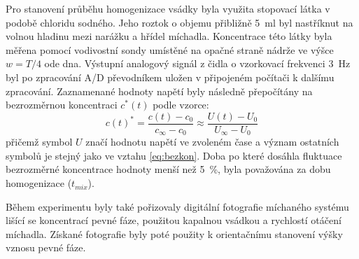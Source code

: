 Pro stanovení průběhu homogenizace vsádky byla využita stopovací látka v podobě chloridu sodného. Jeho roztok o objemu přibližně \SI{5}{\milli\litre} byl nastříknut na volnou hladinu mezi narážku a hřídel míchadla. Koncentrace této látky byla měřena pomocí vodivostní sondy umístěné na opačné straně nádrže ve výšce $w = T/4$ ode dna. Výstupní analogový signál z čidla o vzorkovací frekvenci \SI{3}{\hertz} byl po zpracování A/D převodníkem uložen v připojeném počítači k dalšímu zpracování. Zaznamenané hodnoty napětí byly následně přepočítány na bezrozměrnou koncentraci $c^{*}(t)$ podle vzorce:    
\begin{equation}
	c(t)^{*} = \frac{c(t) - c_{0}}{c_{\infty} - c_{0}} \approx \frac{U(t) - U_{0}}{U_{\infty} - U_{0}}
	\label{eq:bezkonU}
\end{equation}
přičemž symbol $U$ značí hodnotu napětí ve zvoleném čase a význam ostatních symbolů je stejný jako ve vztahu \ref{eq:bezkon}. Doba po které dosáhla fluktuace bezrozměrné koncentrace hodnoty menší než \SI{5}{\percent}, byla považována za dobu homogenizace ($t_{mix}$). 

Během experimentu byly také pořizovaly digitální fotografie míchaného systému lišící se koncentrací pevné fáze, použitou kapalnou vsádkou a rychlostí otáčení míchadla. Získané fotografie byly poté použity k orientačnímu stanovení výšky vznosu pevné fáze. 
